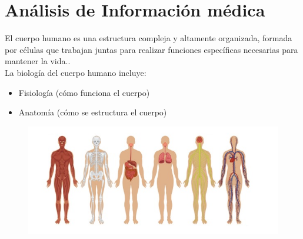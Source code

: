 \section{Análisis de Información médica}
El cuerpo humano es una estructura compleja y altamente organizada, formada por células que trabajan juntas para realizar funciones específicas necesarias para mantener la vida.\cite{web10}.\\
La biología del cuerpo humano incluye:\\
\begin{itemize}
  \item Fisiología (cómo funciona el cuerpo)
  \item Anatomía (cómo se estructura el cuerpo)
  \end{itemize}
\begin{figure}[H]
	\begin{center}
 		\includegraphics[width = .5\textwidth]{source/images/image22.png}
	\end{center} 
\end{figure}

